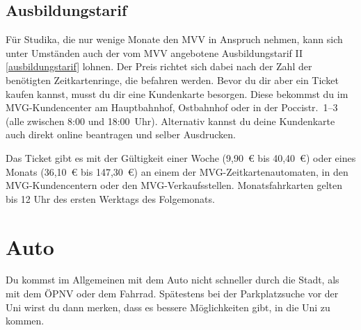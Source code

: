 \begin{urlList}
\end{urlList}

\subsection*{Ausbildungstarif}
Für Studika, die nur wenige Monate den MVV in Anspruch nehmen, kann sich unter
Umständen auch der vom MVV angebotene Ausbildungstarif II
\ref{ausbildungstarif} lohnen. Der Preis richtet sich dabei nach der Zahl der
benötigten Zeitkartenringe, die befahren werden. Bevor du dir aber ein Ticket
kaufen kannst, musst du dir eine Kundenkarte besorgen. Diese bekommst du im
MVG-Kundencenter am Hauptbahnhof, Ostbahnhof oder in der \mbox{Poccistr.}~1--3 (alle
zwischen 8:00 und 18:00~Uhr). Alternativ kannst du deine Kundenkarte auch
direkt online beantragen und selber Ausdrucken.

Das Ticket gibt es mit der Gültigkeit einer Woche (9,90~€ bis 40,40~€) oder eines Monats (36,10~€ bis 147,30~€) an einem der MVG-Zeitkartenautomaten, in den MVG-Kundencentern oder den MVG-Verkaufsstellen. Monatsfahrkarten gelten bis 12 Uhr des ersten Werktags des Folgemonats.

\begin{urlList}
\end{urlList}

\section{Auto}
Du kommst im Allgemeinen mit dem Auto nicht schneller durch die Stadt, als mit dem ÖPNV oder dem Fahrrad. Spätestens bei der Parkplatzsuche vor der Uni wirst du dann merken, dass es bessere Möglichkeiten gibt, in die Uni zu kommen.
